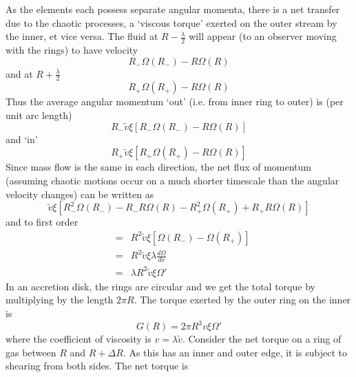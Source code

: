 As the elements each possess separate angular momenta, there is a net transfer due to the chaotic processes, a `viscous torque' exerted
on the outer stream by the inner, et vice versa. The fluid at $R - \frac{\lambda}{2}$ will appear (to an observer moving with the rings)
to have velocity
\begin{equation}
	R_- \Omega (R_-) - R \Omega(R)
	\label{eqn_fluidvelocity1}
\end{equation}
and at $R + \frac{\lambda}{2}$
\begin{equation}
	R_+ \Omega (R_+) - R \Omega(R)
	\label{eqn_fluidvelocity2}
\end{equation}
Thus the average angular momentum `out' (i.e. from inner ring to outer) is (per unit arc length)
\begin{equation}
	R_- \widetilde{v} \xi \left[R_- \Omega (R_-) - R \Omega(R) \right]
	\label{eqn_fluidmomentumout}
\end{equation}
and `in'
\begin{equation}
	R_+ \widetilde{v} \xi \left[R_+ \Omega (R_+) - R \Omega(R) \right]
	\label{eqn_fluidmomentumin}
\end{equation}
Since mass flow is the same in each direction, the net flux of momentum (assuming chaotic motions occur on a much shorter timescale
than the angular velocity changes) can be written as
\begin{equation}
	\widetilde{v} \xi \left[ R_-^2 \Omega (R_-) - R_- R \Omega (R) - R_+^2 \Omega (R_+) + R_+ R \Omega (R) \right]
	\label{eqn_netflux}
\end{equation}
and to first order
\begin{eqnarray}
	&=& R^2 \widetilde{v} \xi \left[ \Omega(R_-) - \Omega(R_+) \right] \nonumber \\
	&=& R^2 \widetilde{v} \xi \lambda  \frac{d \Omega}{dr} \nonumber \\
	&=& \lambda  R^2 \widetilde{v} \xi \Omega '
	\label{eqn_netfluxfirstorder}
\end{eqnarray}
In an accretion disk, the rings are circular and we get the total torque by multiplying by the length $2 \pi R$. The torque exerted by the
outer ring on the inner is
\begin{equation}
	G(R) = 2 \pi R^3 v \xi \Omega '
	\label{eqn_torque}
\end{equation}
where the coefficient of viscosity is $v=\lambda \widetilde v$. Consider the net torque on a ring of gas between $R$ and $R+ \Delta R$.
As this has an inner and outer edge, it is subject to shearing from both sides. The net torque is
